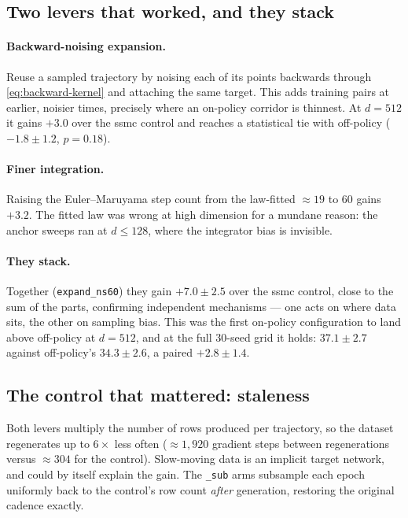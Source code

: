 \subsection{Two levers that worked, and they stack}

\paragraph{Backward-noising expansion.}
Reuse a sampled trajectory by noising each of its points backwards through
\eqref{eq:backward-kernel} and attaching the same target. This adds training
pairs at earlier, noisier times, precisely where an on-policy corridor is
thinnest. At $d=512$ it gains $+3.0$ over the ssmc control and reaches a
statistical tie with off-policy ($-1.8\pm1.2$, $p=0.18$).

\paragraph{Finer integration.}
Raising the Euler--Maruyama step count from the law-fitted $\approx19$ to $60$
gains $+3.2$. The fitted law was wrong at high dimension for a mundane reason:
the anchor sweeps ran at $d\le128$, where the integrator bias is invisible.

\paragraph{They stack.}
Together (\texttt{expand\_ns60}) they gain $+7.0\pm2.5$ over the ssmc control,
close to the sum of the parts, confirming independent mechanisms --- one acts
on where data sits, the other on sampling bias. This was the first on-policy
configuration to land above off-policy at $d=512$, and at the full $30$-seed
grid it holds: $37.1\pm2.7$ against off-policy's $34.3\pm2.6$, a paired
$+2.8\pm1.4$.

\subsection{The control that mattered: staleness}

Both levers multiply the number of rows produced per trajectory, so the
dataset regenerates up to $6\times$ less often ($\approx1{,}920$ gradient steps
between regenerations versus $\approx304$ for the control). Slow-moving data is
an implicit target network, and could by itself explain the gain. The
\texttt{\_sub} arms subsample each epoch uniformly back to the control's row
count \emph{after} generation, restoring the original cadence exactly.

